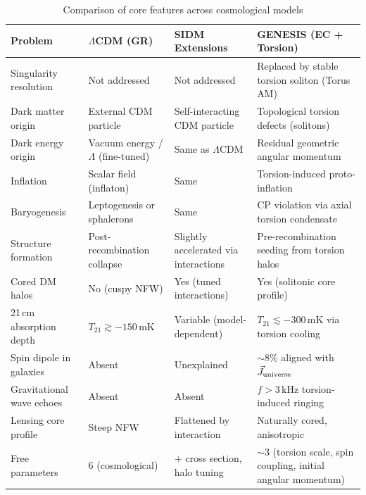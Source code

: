 \documentclass{article}
\begin{document}
\begin{table}[h!]
\centering
\caption{Comparison of core features across cosmological models}
\renewcommand{\arraystretch}{1.4}
\begin{tabular}{|p{3.6cm}|p{4.2cm}|p{4.2cm}|p{4.8cm}|}
\hline
\textbf{Problem} & \textbf{$\Lambda$CDM (GR)} & \textbf{SIDM Extensions} & \textbf{GENESIS (EC + Torsion)} \\
\hline
Singularity resolution & Not addressed & Not addressed & Replaced by stable torsion soliton (Torus AM) \\
\hline
Dark matter origin & External CDM particle & Self-interacting CDM particle & Topological torsion defects (solitons) \\
\hline
Dark energy origin & Vacuum energy / $\Lambda$ (fine-tuned) & Same as $\Lambda$CDM & Residual geometric angular momentum \\
\hline
Inflation & Scalar field (inflaton) & Same & Torsion-induced proto-inflation \\
\hline
Baryogenesis & Leptogenesis or sphalerons & Same & CP violation via axial torsion condensate \\
\hline
Structure formation & Post-recombination collapse & Slightly accelerated via interactions & Pre-recombination seeding from torsion halos \\
\hline
Cored DM halos & No (cuspy NFW) & Yes (tuned interactions) & Yes (solitonic core profile) \\
\hline
21\,cm absorption depth & $T_{21} \gtrsim -150$\,mK & Variable (model-dependent) & $T_{21} \lesssim -300$\,mK via torsion cooling \\
\hline
Spin dipole in galaxies & Absent & Unexplained & $\sim$8\% aligned with $\vec{J}_{\rm universe}$ \\
\hline
Gravitational wave echoes & Absent & Absent & $f > 3$\,kHz torsion-induced ringing \\
\hline
Lensing core profile & Steep NFW & Flattened by interaction & Naturally cored, anisotropic \\
\hline
Free parameters & 6 (cosmological) & $+$ cross section, halo tuning & $\sim$3 (torsion scale, spin coupling, initial angular momentum) \\
\hline
\end{tabular}
\label{tab:model_comparison}
\end{table}

\end{document}
